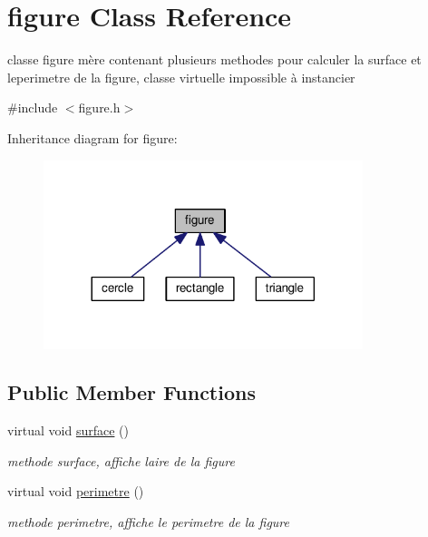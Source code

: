 \hypertarget{classfigure}{}\section{figure Class Reference}
\label{classfigure}


classe figure mère contenant plusieurs methodes pour calculer la surface et leperimetre de la figure, classe virtuelle impossible à instancier  




{\ttfamily \#include $<$figure.\+h$>$}



Inheritance diagram for figure\+:\nopagebreak
\begin{figure}[H]
\begin{center}
\leavevmode
\includegraphics[width=264pt]{classfigure__inherit__graph}
\end{center}
\end{figure}
\subsection*{Public Member Functions}
\begin{DoxyCompactItemize}
\item 
virtual void \hyperlink{classfigure_ad85963e43100c730015701b366755dda}{surface} ()\hypertarget{classfigure_ad85963e43100c730015701b366755dda}{}\label{classfigure_ad85963e43100c730015701b366755dda}

\begin{DoxyCompactList}\small\item\em methode surface, affiche l\textquotesingle{}aire de la figure \end{DoxyCompactList}\item 
virtual void \hyperlink{classfigure_ad6f996a759902c54d77af60047f54e4f}{perimetre} ()\hypertarget{classfigure_ad6f996a759902c54d77af60047f54e4f}{}\label{classfigure_ad6f996a759902c54d77af60047f54e4f}

\begin{DoxyCompactList}\small\item\em methode perimetre, affiche le perimetre de la figure \end{DoxyCompactList}\end{DoxyCompactItemize}



